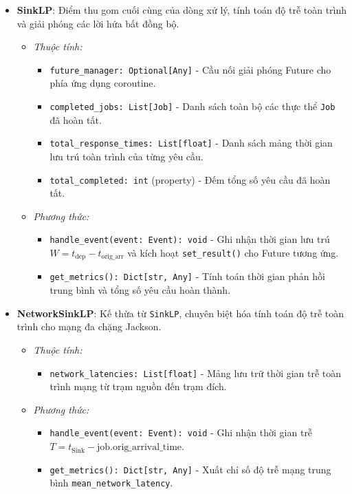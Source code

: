 \begin{itemize}[leftmargin=1.5em, itemsep=8pt]
\item \textbf{SinkLP}: Điểm thu gom cuối cùng của dòng xử lý, tính toán độ trễ toàn trình và giải phóng các lời hứa bất đồng bộ.

\begin{itemize}[leftmargin=1.2em, label={}, itemsep=3pt]
\item[\textendash] \textit{Thuộc tính:}
\begin{itemize}[leftmargin=1.5em, label=+, itemsep=2pt]
\item \texttt{future\_manager: Optional[Any]} - Cầu nối giải phóng Future cho phía ứng dụng coroutine.
\item \texttt{completed\_jobs: List[Job]} - Danh sách toàn bộ các thực thể \texttt{Job} đã hoàn tất.
\item \texttt{total\_response\_times: List[float]} - Danh sách mảng thời gian lưu trú toàn trình của từng yêu cầu.
\item \texttt{total\_completed: int} (property) - Đếm tổng số yêu cầu đã hoàn tất.
\end{itemize}

\item[\textendash] \textit{Phương thức:}
\begin{itemize}[leftmargin=1.5em, label=+, itemsep=2pt]
\item \texttt{handle\_event(event: Event): void} - Ghi nhận thời gian lưu trú $W = t_{\text{dep}} - t_{\text{orig\_arr}}$ và kích hoạt \texttt{set\_result()} cho Future tương ứng.
\item \texttt{get\_metrics(): Dict[str, Any]} - Tính toán thời gian phản hồi trung bình và tổng số yêu cầu hoàn thành.
\end{itemize}
\end{itemize}

\item \textbf{NetworkSinkLP}: Kế thừa từ \texttt{SinkLP}, chuyên biệt hóa tính toán độ trễ toàn trình cho mạng đa chặng Jackson.

\begin{itemize}[leftmargin=1.2em, label={}, itemsep=3pt]
\item[\textendash] \textit{Thuộc tính:}
\begin{itemize}[leftmargin=1.5em, label=+, itemsep=2pt]
\item \texttt{network\_latencies: List[float]} - Mảng lưu trữ thời gian trễ toàn trình mạng từ trạm nguồn đến trạm đích.
\end{itemize}

\item[\textendash] \textit{Phương thức:}
\begin{itemize}[leftmargin=1.5em, label=+, itemsep=2pt]
\item \texttt{handle\_event(event: Event): void} - Ghi nhận thời gian trễ $T = t_{\text{Sink}} - \text{job.orig\_arrival\_time}$.
\item \texttt{get\_metrics(): Dict[str, Any]} - Xuất chỉ số độ trễ mạng trung bình \texttt{mean\_network\_latency}.
\end{itemize}
\end{itemize}


\end{itemize}
